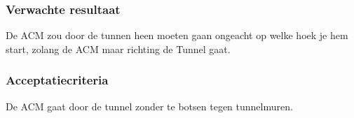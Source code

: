 \subsubsection{Verwachte resultaat}

\begin{flushleft}
    De ACM zou door de tunnen heen moeten gaan ongeacht op welke hoek je hem start, zolang de ACM maar richting de Tunnel gaat.
\end{flushleft}
\subsubsection{Acceptatiecriteria}
\begin{flushleft}
    De ACM gaat door de tunnel zonder te botsen tegen tunnelmuren.
\end{flushleft}
